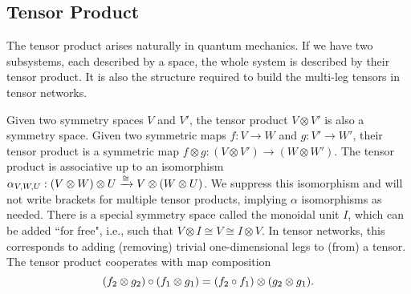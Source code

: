 
\subsection{Tensor Product}
\label{subsec:nonablian:basics:monoidal}

The tensor product arises naturally in quantum mechanics.
%
If we have two subsystems, each described by a space, the whole system is described by their tensor product.
%
It is also the structure required to build the multi-leg tensors in tensor networks.

Given two symmetry spaces $V$ and $V'$, the tensor product $V \otimes V'$ is also a symmetry space.
%
Given two symmetric maps $f: V \to W$ and $g: V' \to W'$, their tensor product is a symmetric map $f \otimes g : (V \otimes V') \to (W \otimes W')$.
%
The tensor product is associative up to an isomorphism $\alpha_{V, W, U} : (V \otimes W) \otimes U \xrightarrow{\cong} V \otimes (W \otimes U)$.
%
We suppress this isomorphism and will not write brackets for multiple tensor products, implying $\alpha$ isomorphisms as needed.
%
There is a special symmetry space called the monoidal unit $I$, which can be added ``for free", i.e., such that $V \otimes I \cong V \cong I \otimes V$.
%
In tensor networks, this corresponds to adding (removing) trivial one-dimensional legs to (from) a tensor.
%
The tensor product cooperates with map composition
\begin{equation}
    \label{eq:nonabelian:basics:tensor_cooperates_with_compose}
    (f_2 \otimes g_2) \circ (f_1 \otimes g_1) = (f_2 \circ f_1) \otimes (g_2 \otimes g_1)
    .
\end{equation}



